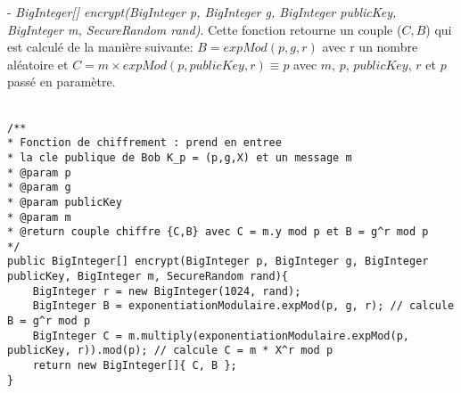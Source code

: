 \documentclass[a4paper,11pt]{article}
\begin{document}
        - \textit{BigInteger[] encrypt(BigInteger p, BigInteger g, BigInteger publicKey, BigInteger m, SecureRandom rand)}. Cette fonction retourne un couple ($C,B$) qui est calculé de la manière suivante: $B = expMod(p,g,r)$ avec r un nombre aléatoire et $C = m \times expMod(p, publicKey,r) \equiv p$ avec $m$, $p$, $publicKey$, $r$ et $p$ passé en paramètre.\\\\\begin{lstlisting}[caption=encrypt, captionpos=b,breaklines = true]
/**
* Fonction de chiffrement : prend en entree
* la cle publique de Bob K_p = (p,g,X) et un message m
* @param p
* @param g
* @param publicKey
* @param m
* @return couple chiffre {C,B} avec C = m.y mod p et B = g^r mod p
*/
public BigInteger[] encrypt(BigInteger p, BigInteger g, BigInteger publicKey, BigInteger m, SecureRandom rand){
    BigInteger r = new BigInteger(1024, rand);
    BigInteger B = exponentiationModulaire.expMod(p, g, r); // calcule B = g^r mod p
    BigInteger C = m.multiply(exponentiationModulaire.expMod(p, publicKey, r)).mod(p); // calcule C = m * X^r mod p
    return new BigInteger[]{ C, B };
}
        \end{lstlisting}
\end{document}
